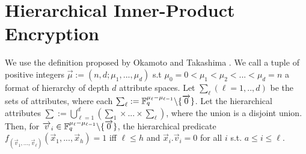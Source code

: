 \section{Hierarchical Inner-Product Encryption}
We use the definition proposed by Okamoto and Takashima \cite{AC:OkaTak09}. We call a tuple of positive integers $\overrightarrow{\mu}:=(n,d;\mu_{1},...,\mu_{d})$ s.t $\mu_{0}=0<\mu_{1}<\mu_{2}<...<\mu_{d}=n$ a format of hierarchy of depth $d$ attribute spaces. Let $\sum_{\ell}(\ell=1,..,d)$ be the sets of attributes, where each $\sum_{\ell}:= \mathbb{F}^{\mu_{\ell}-\mu_{\ell-1}}_{q} \backslash \{\overrightarrow{0}\}$. Let the hierarchical attributes $\sum:=\bigcup^{d}_{\ell=1}(\sum_{1} \times ...\times \sum_{\ell})$, where the union is a disjoint union. Then, for $\overrightarrow{v}_{i} \in \mathbb{F}^{\mu_{\ell}-\mu_{\ell-1}}_{q} \backslash \{\overrightarrow{0}\}$, the hierarchical predicate $f_{(\overrightarrow{v}_{1},...,\overrightarrow{v}_{\ell})}(\overrightarrow{x}_{1},...,\overrightarrow{x}_{h})=1$ iff $\ell\leq h$ and $\overrightarrow{x}_{i}.\overrightarrow{v}_{i}=0$ for all $i$ s.t. $a\leq i \leq \ell$.\

